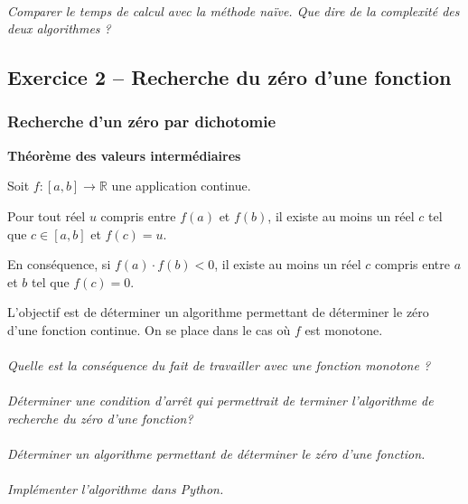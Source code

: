 \documentclass[11pt,oneside]{article}
\begin{document}
\paragraph{}
\textit{Comparer le temps de calcul avec la méthode naïve. Que dire de la complexité des deux algorithmes ?}

\subsection*{Exercice 2 -- Recherche du zéro d'une fonction}
\subsubsection*{Recherche d'un zéro par dichotomie}
\setcounter{paragraph}{0}

\begin{theo}
\textbf{Théorème des valeurs intermédiaires}


Soit $f:[a,b]\rightarrow \mathbb{R}$ une application continue.

Pour tout réel $u$ compris entre $f(a)$ et $f(b)$, il existe au moins un réel $c$ tel que $c\in[a,b]$ et $f(c)=u$.

En conséquence, si $f(a)\cdot f(b)<0$, il existe au moins un réel $c$ compris entre $a$ et $b$ tel que $f(c)=0$.

\end{theo}


L'objectif est de déterminer un algorithme permettant de déterminer le zéro d'une fonction continue. On se place dans le cas où $f$ est monotone. 

\paragraph{}
\textit{Quelle est la conséquence du fait de travailler avec une fonction monotone ?}


\paragraph{}
\textit{Déterminer une condition d'arrêt qui permettrait de terminer l'algorithme de recherche du zéro d'une fonction?}

\paragraph{}
\textit{Déterminer un algorithme permettant de déterminer le zéro d'une fonction.}

\paragraph{}
\textit{Implémenter l'algorithme dans Python.}
\end{document}
